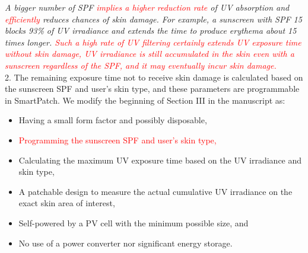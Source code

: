 \documentclass[onecolumn]{IEEEconf}
\begin{document}
\begin{description}
\textit{A bigger number of SPF \textcolor{red}{implies a higher reduction rate} of UV absorption and \textcolor{red}{efficiently} reduces chances of skin damage. For example, a sunscreen with SPF 15 blocks 93\% of UV irradiance and extends the time to produce erythema about 15 times longer. \textcolor{red}{Such a high rate of UV filtering certainly extends UV exposure time without skin damage, UV irradiance is still accumulated in the skin even with a sunscreen regardless of the SPF, and it may eventually incur skin damage.}}\\

2. The remaining exposure time not to receive skin damage is calculated based on the sunscreen SPF and user's skin type, and these parameters are programmable in SmartPatch. We modify the beginning of Section III in the manuscript as:

\begin{itemize}
\item Having a small form factor and possibly disposable,
\item \textcolor{red}{Programming the sunscreen SPF and user's skin type,}
\item Calculating the maximum UV exposure time based on the UV irradiance and skin type,
\item A patchable design to measure the actual cumulative UV irradiance on the exact skin area of interest,
\item Self-powered by a PV cell with the minimum possible size, and
\item No use of a power converter nor significant energy storage.
\end{itemize}

\end{description}

\pagebreak
\end{document}
